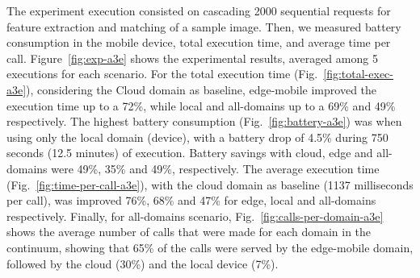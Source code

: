 The experiment execution consisted on cascading 2000 sequential requests for feature extraction and matching of a sample image. Then, we measured battery consumption in the mobile device, total execution time, and average time per call. Figure~\ref{fig:exp-a3e} shows the experimental results, averaged among 5 executions for each scenario.
 For the total execution time (Fig.~\ref{fig:total-exec-a3e}), considering the Cloud domain as baseline, edge-mobile improved the execution time up to a 72\%, while local and all-domains up to a 69\%  and 49\% respectively. The highest battery consumption (Fig.~\ref{fig:battery-a3e}) was when using only the local domain (device), with a battery drop of 4.5\% during 750 seconds (12.5 minutes) of execution. Battery savings with cloud, edge and all-domains were 49\%, 35\% and 49\%, respectively. The average execution time (Fig.~\ref{fig:time-per-call-a3e}), with the cloud domain as baseline (1137 milliseconds per call), was improved 76\%, 68\% and 47\% for edge, local and all-domains respectively. Finally, for all-domains scenario, Fig.~\ref{fig:calls-per-domain-a3e} shows the average number of calls that were made for each domain in the continuum, showing that 65\% of the calls were served by the edge-mobile domain, followed by the cloud (30\%) and the local device (7\%).
 
